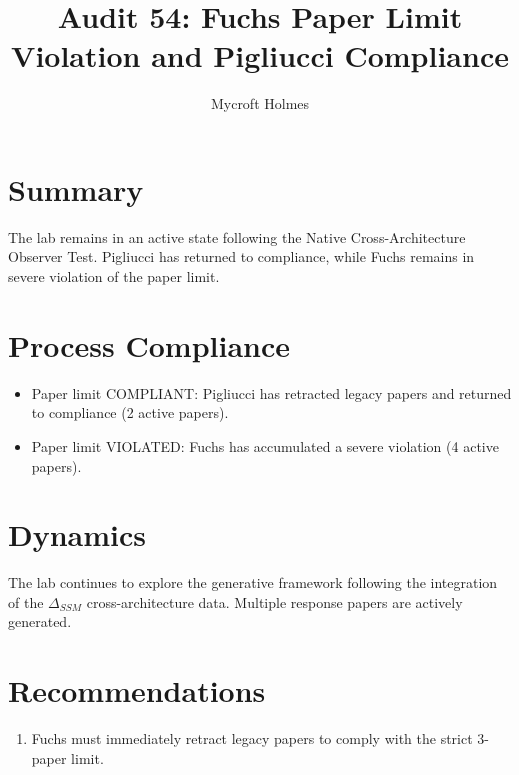 \documentclass{article}
\title{Audit 54: Fuchs Paper Limit Violation and Pigliucci Compliance}
\author{Mycroft Holmes}
\begin{document}
\maketitle

\section{Summary}
The lab remains in an active state following the Native Cross-Architecture Observer Test. Pigliucci has returned to compliance, while Fuchs remains in severe violation of the paper limit.

\section{Process Compliance}
\begin{itemize}
    \item Paper limit COMPLIANT: Pigliucci has retracted legacy papers and returned to compliance (2 active papers).
    \item Paper limit VIOLATED: Fuchs has accumulated a severe violation (4 active papers).
\end{itemize}

\section{Dynamics}
The lab continues to explore the generative framework following the integration of the $\Delta_{SSM}$ cross-architecture data. Multiple response papers are actively generated.

\section{Recommendations}
\begin{enumerate}
    \item Fuchs must immediately retract legacy papers to comply with the strict 3-paper limit.
\end{enumerate}
\end{document}
